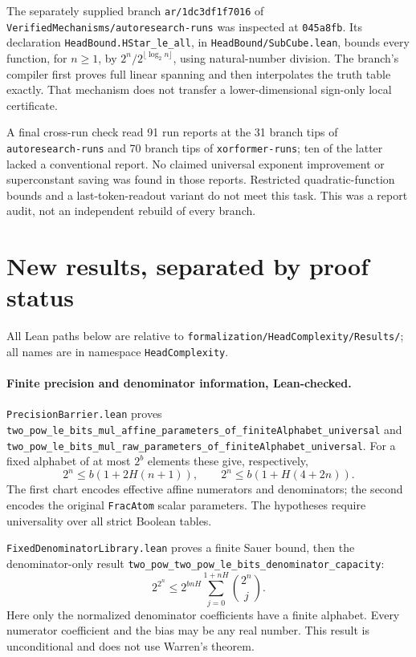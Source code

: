 \documentclass[11pt]{article}
\begin{document}
The separately supplied branch
\texttt{ar/1dc3df1f7016} of
\texttt{VerifiedMechanisms/autoresearch-runs} was inspected at
\texttt{045a8fb}. Its declaration
\texttt{HeadBound.HStar\_le\_all}, in
\texttt{HeadBound/SubCube.lean}, bounds every function, for $n\geq1$, by
$2^n/2^{\lfloor\log_2 n\rfloor}$, using natural-number division.
The branch's compiler first proves full linear spanning and then
interpolates the truth table exactly. That mechanism does not transfer
a lower-dimensional sign-only local certificate.

A final cross-run check read 91 run reports at the 31 branch tips of
\texttt{autoresearch-runs} and 70 branch tips of
\texttt{xorformer-runs}; ten of the latter lacked a conventional
report. No claimed universal exponent improvement or superconstant
saving was found in those reports. Restricted quadratic-function
bounds and a last-token-readout variant do not meet this task.
This was a report audit, not an independent rebuild of every branch.

\section{New results, separated by proof status}

All Lean paths below are relative to
\texttt{formalization/HeadComplexity/Results/}; all names are in
namespace \texttt{HeadComplexity}.

\paragraph{Finite precision and denominator information, Lean-checked.}
\texttt{PrecisionBarrier.lean} proves
\texttt{two\_pow\_le\_bits\_mul\_affine\_parameters\_of\_finiteAlphabet\_universal}
and
\texttt{two\_pow\_le\_bits\_mul\_raw\_parameters\_of\_finiteAlphabet\_universal}.
For a fixed alphabet of at most $2^b$ elements these give, respectively,
\[
 2^n\leq b(1+2H(n+1)),\qquad
 2^n\leq b(1+H(4+2n)).
\]
The first chart encodes effective affine numerators and denominators;
the second encodes the original \texttt{FracAtom} scalar parameters.
The hypotheses require universality over all strict Boolean tables.

\texttt{FixedDenominatorLibrary.lean} proves a finite Sauer bound,
then the denominator-only result
\texttt{two\_pow\_two\_pow\_le\_bits\_denominator\_capacity}:
\[
 2^{2^n}\leq 2^{bnH}
       \sum_{j=0}^{1+nH}\binom{2^n}{j}.
\]
Here only the normalized denominator coefficients have a finite
alphabet. Every numerator coefficient and the bias may be any real
number. This result is unconditional and does not use Warren's theorem.
\end{document}
